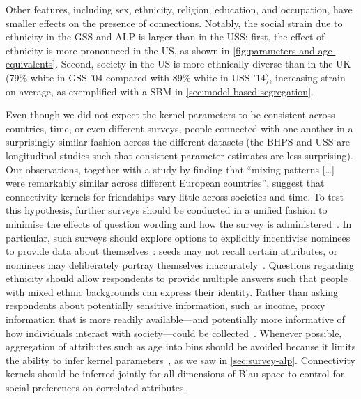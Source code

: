 \documentclass{scrartcl}
\begin{document}
Other features, including sex, ethnicity, religion, education, and occupation, have smaller effects on the presence of connections. Notably, the social strain due to ethnicity in the GSS and ALP is larger than in the USS: first, the effect of ethnicity is more pronounced in the US, as shown in \cref{fig:parameters-and-age-equivalents}. Second, society in the US is more ethnically diverse than in the UK (79\% white in GSS '04 compared with 89\% white in USS '14), increasing strain on average, as exemplified with a SBM in \cref{sec:model-based-segregation}.

Even though we did not expect the kernel parameters to be consistent across countries, time, or even different surveys, people connected with one another in a surprisingly similar fashion across the different datasets (the BHPS and USS are longitudinal studies such that consistent parameter estimates are less surprising). Our observations, together with a study by \textcite{Mossong2008} finding that ``mixing patterns [\ldots] were remarkably similar across different European countries'', suggest that connectivity kernels for friendships vary little across societies and time. To test this hypothesis, further surveys should be conducted in a unified fashion to minimise the effects of question wording and how the survey is administered~\cite{Eagle2015}. In particular, such surveys should explore options to explicitly incentivise nominees to provide data about themselves~\cite{Biernacki1981}: seeds may not recall certain attributes, or nominees may deliberately portray themselves inaccurately~\cite{Bruch2016}. Questions regarding ethnicity should allow respondents to provide multiple answers such that people with mixed ethnic backgrounds can express their identity. Rather than asking respondents about potentially sensitive information, such as income, proxy information that is more readily available---and potentially more informative of how individuals interact with society---could be collected~\cite{Po2012}. Whenever possible, aggregation of attributes such as age into bins should be avoided because it limits the ability to infer kernel parameters~\cite{Hutcheon2010}, as we saw in \cref{sec:survey-alp}. Connectivity kernels should be inferred jointly for all dimensions of Blau space to control for social preferences on correlated attributes.
\end{document}
